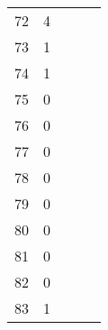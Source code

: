 \begin{center}
\begin{table}[H]
\begin{tabular}{ccccc}
\num{   72} & \num{    4} \\
\num{   73} & \num{    1} \\
\num{   74} & \num{    1} \\
\num{   75} & \num{    0} \\
\num{   76} & \num{    0} \\
\num{   77} & \num{    0} \\
\num{   78} & \num{    0} \\
\num{   79} & \num{    0} \\
\num{   80} & \num{    0} \\
\num{   81} & \num{    0} \\
\num{   82} & \num{    0} \\
\num{   83} & \num{    1} \\
\bottomrule
\end{tabular}
\end{table}
\end{center}

